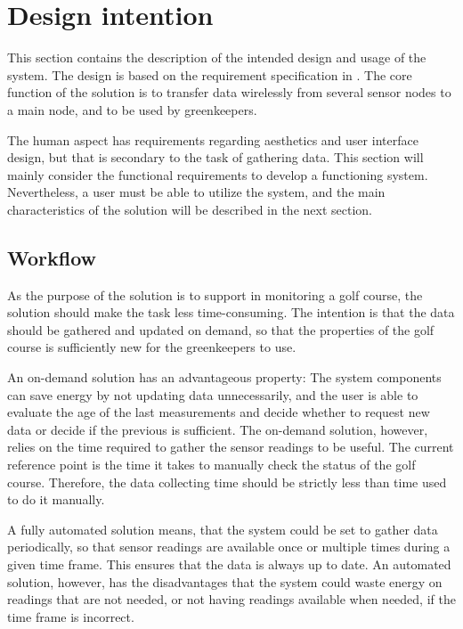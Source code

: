 \section{Design intention}
This section contains the description of the intended design and usage of the system. The design is based on the requirement specification in . The core function of the solution is to transfer data wirelessly from several sensor nodes to a main node, and to be used by greenkeepers. 

The human aspect has requirements regarding aesthetics and user interface design, but that is secondary to the task of gathering data. This section will mainly consider the functional requirements to develop a functioning system. Nevertheless, a user must be able to utilize the system, and the main characteristics of the solution will be described in the next section.

\subsection{Workflow}\label{cha:workflowDesign}
As the purpose of the solution is to support in monitoring a golf course, the solution should make the task less time-consuming. The intention is that the data should be gathered and updated on demand, so that the properties of the golf course is sufficiently new for the greenkeepers to use.

An on-demand solution has an advantageous property: The system components can save energy by not updating data unnecessarily, and the user is able to evaluate the age of the last measurements and decide whether to request new data or decide if the previous is sufficient. The on-demand solution, however, relies on the time required to gather the sensor readings to be useful. The current reference point is the time it takes to manually check the status of the golf course. Therefore, the data collecting time should be strictly less than time used to do it manually.

A fully automated solution means, that the system could be set to gather data periodically, so that sensor readings are available once or multiple times during a given time frame. This ensures that the data is always up to date. An automated solution, however, has the disadvantages that the system could waste energy on readings that are not needed, or not having readings available when needed, if the time frame is incorrect.

